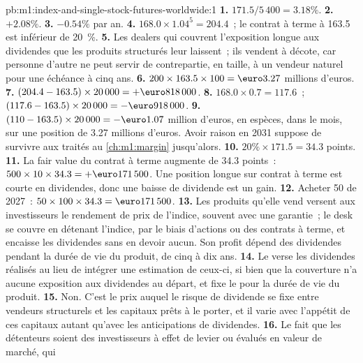 \begin{solution}{pb:m1:index-and-single-stock-futures-worldwide:1}
\textbf{1.} $171.5/5\,400 = 3.18\%$.
\textbf{2.} $+2.08\%$.
\textbf{3.} $-0.54\%$ par an.
\textbf{4.} $168.0 \times 1.04^5 = 204.4$~; le contrat à terme à 163.5 est inférieur de 20~\%.
\textbf{5.} Les dealers qui couvrent l'exposition longue aux dividendes que les produits structurés
leur laissent~; ils vendent à décote, car personne d'autre ne peut servir de
contrepartie, en taille, à un vendeur naturel pour une échéance à cinq ans.
\textbf{6.} $200 \times 163.5 \times 100 = \text{\euro}3.27$ millions d'euros.
\textbf{7.} $(204.4 - 163.5) \times 20\,000 = +\text{\euro}818\,000$.
\textbf{8.} $168.0 \times 0.7 = 117.6$~; $(117.6 - 163.5) \times 20\,000 =
-\text{\euro}918\,000$.
\textbf{9.} $(110 - 163.5) \times 20\,000 = -\text{\euro}1.07$ million d'euros, en
espèces, dans le mois, sur une position de 3.27 millions d'euros. Avoir raison en 2031
suppose de survivre aux  traités au \cref{ch:m1:margin} jusqu'alors.
\textbf{10.} $20\% \times 171.5 = 34.3$ points.
\textbf{11.} La fair value du contrat à terme augmente de 34.3 points~: $500 \times 10
\times 34.3 = +\text{\euro}171\,500$. Une position longue sur contrat à terme est courte en dividendes, donc une
baisse de dividende est un gain.
\textbf{12.} Acheter 50  de 2027~: $50 \times 100 \times 34.3 =
\text{\euro}171\,500$.
\textbf{13.} Les produits qu'elle vend versent aux investisseurs le rendement de prix de l'indice,
souvent avec une garantie~; le desk se couvre en détenant l'indice, par le biais d'actions
ou des contrats à terme, et encaisse les dividendes sans en devoir aucun. Son profit dépend
des dividendes pendant la durée de vie du produit, de cinq à dix ans.
\textbf{14.} Le  verse les dividendes réalisés au lieu de
intégrer une estimation de ceux-ci, si bien que la couverture n'a aucune exposition aux
dividendes au départ, et fixe le  pour la durée de vie du produit.
\textbf{15.} Non. C'est le prix auquel le risque de dividende se fixe entre
vendeurs structurels et les capitaux prêts à le porter, et il varie avec l'appétit
de ces capitaux autant qu'avec les anticipations de dividendes.
\textbf{16.} Le fait que les détenteurs soient des investisseurs à effet de levier ou évalués en valeur de marché, qui

\end{solution}
